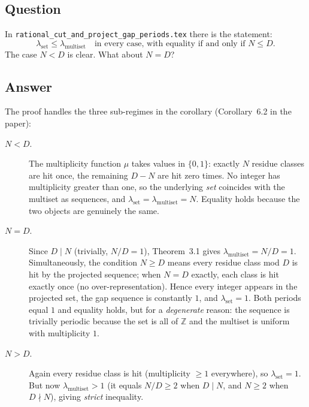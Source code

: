 \documentclass{amsart}
\theoremstyle{definition}
\theoremstyle{plain}
\theoremstyle{remark}
\begin{document}
\subsection*{Question}

In \texttt{rational\_cut\_and\_project\_gap\_periods.tex} there is the statement:
\[
  \lambda_{\mathrm{set}} \le \lambda_{\mathrm{multiset}}
  \quad\text{in every case, with equality if and only if } N \le D.
\]
The case \(N < D\) is clear.  What about \(N = D\)?

\subsection*{Answer}

The proof handles the three sub-regimes in the corollary (Corollary~6.2 in the
paper):

\begin{description}
  \item[\(N < D\).]
    The multiplicity function \(\mu\) takes values in \(\{0,1\}\): exactly
    \(N\) residue classes are hit once, the remaining \(D - N\) are hit zero
    times.  No integer has multiplicity greater than one, so the underlying
    \emph{set} coincides with the multiset as sequences, and
    \(\lambda_{\mathrm{set}} = \lambda_{\mathrm{multiset}} = N\).
    Equality holds because the two objects are genuinely the same.

  \item[\(N = D\).]
    Since \(D \mid N\) (trivially, \(N/D = 1\)), Theorem~3.1 gives
    \(\lambda_{\mathrm{multiset}} = N/D = 1\).  Simultaneously, the condition
    \(N \ge D\) means every residue class mod \(D\) is hit by the projected
    sequence; when \(N = D\) exactly, each class is hit exactly once (no
    over-representation).  Hence every integer appears in the projected set,
    the gap sequence is constantly \(1\), and \(\lambda_{\mathrm{set}} = 1\).
    Both periods equal \(1\) and equality holds, but for a \emph{degenerate}
    reason: the sequence is trivially periodic because the set is all of
    \(\mathbb{Z}\) and the multiset is uniform with multiplicity \(1\).

  \item[\(N > D\).]
    Again every residue class is hit (multiplicity \(\ge 1\) everywhere), so
    \(\lambda_{\mathrm{set}} = 1\).  But now \(\lambda_{\mathrm{multiset}} > 1\)
    (it equals \(N/D \ge 2\) when \(D \mid N\), and \(N \ge 2\) when
    \(D \nmid N\)), giving \emph{strict} inequality.
\end{description}
\end{document}
